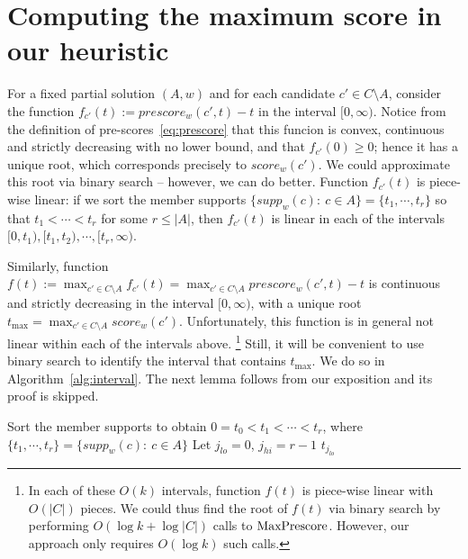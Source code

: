 \section{Computing the maximum score in our heuristic}\label{s:maxscore}

For a fixed partial solution $(A,w)$ and for each candidate $c'\in C\setminus A$, consider the function 
$f_{c'}(t):=prescore_w(c',t)-t$ in the interval $[0,\infty)$. 
Notice from the definition of pre-scores~\eqref{eq:prescore} that this funcion is convex, continuous and strictly decreasing with no lower bound, and that $f_{c'}(0)\geq 0$; hence it has a unique root, which corresponds precisely to $score_w(c')$. We could approximate this root via binary search -- however, we can do better. Function $f_{c'}(t)$ is piece-wise linear: if we sort the member supports $\{supp_w(c): \ c\in A\}=\{t_1, \cdots, t_r\}$ so that $t_1 < \cdots < t_r$ for some $r\leq |A|$, then $f_{c'}(t)$ is linear in each of the intervals $[0, t_1), [t_1, t_2), \cdots, [t_r, \infty)$.

Similarly, function $f(t):= \max_{c'\in C\setminus A} f_{c'}(t) = \max_{c'\in C\setminus A} prescore_w(c',t) -t$ is continuous and strictly decreasing in the interval $[0,\infty)$, with a unique root $t_{\max}=\max_{c'\in C\setminus A} score_w(c')$. Unfortunately, this function is in general not linear within each of the intervals above.%
%
\footnote{In each of these $O(k)$ intervals, function $f(t)$ is piece-wise linear with $O(|C|)$ pieces. We could thus find the root of $f(t)$ via binary search by performing $O(\log k + \log |C|)$ calls to $\operatorname{MaxPrescore}$. However, our approach only requires $O(\log k)$ such calls.} %
%
Still, it will be convenient to use binary search to identify the interval that contains $t_{\max}$. We do so in Algorithm~\ref{alg:interval}. The next lemma follows from our exposition and its proof is skipped.

\begin{algorithm}[htb]\label{alg:interval}
\SetAlgoLined
{}
Sort the member supports to obtain $0=t_0<t_1<\cdots <t_r$, where $\{t_1, \cdots, t_r\}=\{supp_w(c): \ c\in A\}$\;
Let $j_{lo}=0$, $j_{hi}=r-1$\;
\Return $t_{j_{lo}}$\;

 \caption{$\interval(M,w)$}
\end{algorithm}

